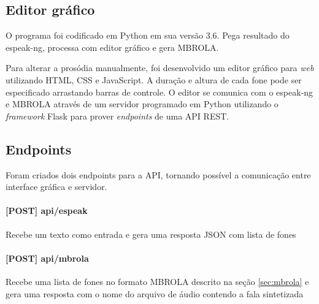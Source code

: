 \subsection{Editor gráfico}
O programa foi codificado em Python em sua versão 3.6. Pega resultado do espeak-ng, processa com editor gráfico e gera MBROLA.

Para alterar a prosódia manualmente, foi desenvolvido um editor gráfico
para \emph{web} utilizando HTML, CSS e JavaScript. A duração e altura de cada
fone pode ser especificado arrastando barras de controle. O editor se comunica
com o espeak-ng e MBROLA através de um servidor programado em Python utilizando
o \emph{framework} Flask para prover \emph{endpoints} de uma API REST.

\subsection{Endpoints}
Foram criados dois endpoints para a API, tornando possível a comunicação entre
interface gráfica e servidor.

\paragraph{[POST] api/espeak} Recebe um texto como entrada e gera uma resposta
JSON com lista de fones
\paragraph{[POST] api/mbrola} Recebe uma lista de fones no formato MBROLA
descrito na seção \ref{sec:mbrola} e gera uma resposta com o nome do arquivo de
áudio contendo a fala sintetizada


